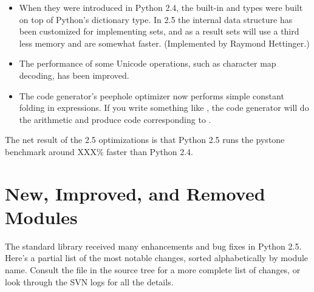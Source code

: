 \documentclass{howto}
\begin{document}
\begin{itemize}

\item When they were introduced 
in Python 2.4, the built-in  and  types
were built on top of Python's dictionary type.  
In 2.5 the internal data structure has been customized for implementing sets,
and as a result sets will use a third less memory and are somewhat faster.
(Implemented by Raymond Hettinger.)

\item The performance of some Unicode operations, such as 
character map decoding, has been improved.

\item The code generator's peephole optimizer now performs
simple constant folding in expressions.  If you write something like
, the code generator will do the arithmetic and produce
code corresponding to .

\end{itemize}

The net result of the 2.5 optimizations is that Python 2.5 runs the
pystone benchmark around XXX\% faster than Python 2.4.


\section{New, Improved, and Removed Modules\label{modules}}

The standard library received many enhancements and bug fixes in
Python 2.5.  Here's a partial list of the most notable changes, sorted
alphabetically by module name. Consult the  file in
the source tree for a more complete list of changes, or look through
the SVN logs for all the details.
\end{document}
